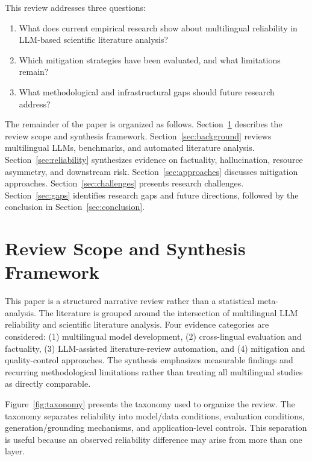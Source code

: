 \documentclass[acmsmall,screen,review]{acmart}
\begin{document}
This review addresses three questions:

\begin{enumerate}

    \item What does current empirical research show about multilingual reliability in LLM-based scientific literature analysis?

    \item Which mitigation strategies have been evaluated, and what limitations remain?

    \item What methodological and infrastructural gaps should future research address?

\end{enumerate}

The remainder of the paper is organized as follows. Section~\ref{sec:scope} describes the review scope and synthesis framework. Section~\ref{sec:background} reviews multilingual LLMs, benchmarks, and automated literature analysis. Section~\ref{sec:reliability} synthesizes evidence on factuality, hallucination, resource asymmetry, and downstream risk. Section~\ref{sec:approaches} discusses mitigation approaches. Section~\ref{sec:challenges} presents research challenges. Section~\ref{sec:gaps} identifies research gaps and future directions, followed by the conclusion in Section~\ref{sec:conclusion}.


\section{Review Scope and Synthesis Framework}
\label{sec:scope}

This paper is a structured narrative review rather than a statistical meta-analysis. The literature is grouped around the intersection of multilingual LLM reliability and scientific literature analysis. Four evidence categories are considered: (1) multilingual model development, (2) cross-lingual evaluation and factuality, (3) LLM-assisted literature-review automation, and (4) mitigation and quality-control approaches. The synthesis emphasizes measurable findings and recurring methodological limitations rather than treating all multilingual studies as directly comparable.

Figure~\ref{fig:taxonomy} presents the taxonomy used to organize the review. The taxonomy separates reliability into model/data conditions, evaluation conditions, generation/grounding mechanisms, and application-level controls. This separation is useful because an observed reliability difference may arise from more than one layer.
\end{document}
